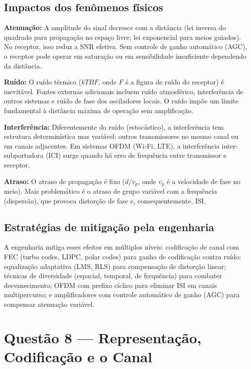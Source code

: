 \documentclass[conference]{IEEEtran}
\begin{document}
\subsection*{Impactos dos fenômenos físicos}

\textbf{Atenuação:} A amplitude do sinal decresce com a distância (lei inversa do quadrado
para propagação no espaço livre; lei exponencial para meios guiados). No receptor, isso
reduz a SNR efetiva. Sem controle de ganho automático (AGC), o receptor pode operar em
saturação ou em sensibilidade insuficiente dependendo da distância.

\textbf{Ruído:} O ruído térmico ($kTBF$, onde $F$ é a figura de ruído do receptor) é
inevitável. Fontes externas adicionais incluem ruído atmosférico, interferência de outros
sistemas e ruído de fase dos osciladores locais. O ruído impõe um limite fundamental à
distância máxima de operação sem amplificação.

\textbf{Interferência:} Diferentemente do ruído (estocástico), a interferência tem
estrutura determinística mas variável: outros transmissores no mesmo canal ou em canais
adjacentes. Em sistemas OFDM (Wi-Fi, LTE), a interferência inter-subportadora (ICI)
surge quando há erro de frequência entre transmissor e receptor.

\textbf{Atraso:} O atraso de propagação é fixo ($d/v_p$, onde $v_p$ é a velocidade de
fase no meio). Mais problemático é o atraso de grupo variável com a frequência (dispersão),
que provoca distorção de fase e, consequentemente, ISI.

\subsection*{Estratégias de mitigação pela engenharia}

A engenharia mitiga esses efeitos em múltiplos níveis: codificação de canal com FEC
(turbo codes, LDPC, polar codes) para ganho de codificação contra ruído; equalização
adaptativa (LMS, RLS) para compensação de distorção linear; técnicas de diversidade
(espacial, temporal, de frequência) para combater desvanecimento; OFDM com prefixo
cíclico para eliminar ISI em canais multipercurso; e amplificadores com controle automático
de ganho (AGC) para compensar atenuação variável.

\section*{Questão 8 — Representação, Codificação e o Canal}
\end{document}
